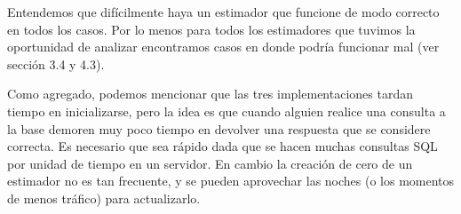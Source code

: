 Entendemos que difícilmente haya un estimador que funcione de modo correcto en todos los casos. Por lo menos para todos los estimadores que tuvimos la oportunidad de analizar encontramos casos en donde podría funcionar mal (ver sección 3.4 y 4.3).

Como agregado, podemos mencionar que las tres implementaciones tardan tiempo en inicializarse, pero la idea es que cuando alguien realice una consulta a la base demoren muy poco tiempo en devolver una respuesta que se considere correcta. Es necesario que sea rápido dada que se hacen muchas consultas SQL por unidad de tiempo en un servidor. En cambio la creación de cero de un estimador no es tan frecuente, y se pueden aprovechar las noches (o los momentos de menos tráfico) para actualizarlo. 
